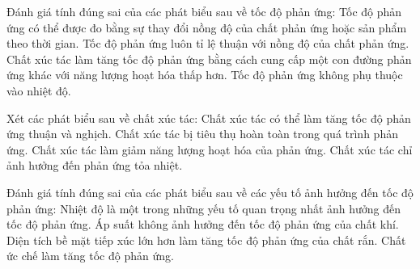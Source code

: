 \documentclass[Main.tex]{subfiles}
\begin{document}
\begin{ex}
	Đánh giá tính đúng sai của các phát biểu sau về tốc độ phản ứng:
	\choiceTF
	{\True Tốc độ phản ứng có thể được đo bằng sự thay đổi nồng độ của chất phản ứng hoặc sản phẩm theo thời gian.}
	{Tốc độ phản ứng luôn tỉ lệ thuận với nồng độ của chất phản ứng.}
	{\True Chất xúc tác làm tăng tốc độ phản ứng bằng cách cung cấp một con đường phản ứng khác với năng lượng hoạt hóa thấp hơn.}
	{Tốc độ phản ứng không phụ thuộc vào nhiệt độ.}
\end{ex}
\begin{ex}
	Xét các phát biểu sau về chất xúc tác:
	\choiceTF
	{\True Chất xúc tác có thể làm tăng tốc độ phản ứng thuận và nghịch.}
	{Chất xúc tác bị tiêu thụ hoàn toàn trong quá trình phản ứng.}
	{\True Chất xúc tác làm giảm năng lượng hoạt hóa của phản ứng.}
	{Chất xúc tác chỉ ảnh hưởng đến phản ứng tỏa nhiệt.}
\end{ex}
\begin{ex}
	Đánh giá tính đúng sai của các phát biểu sau về các yếu tố ảnh hưởng đến tốc độ phản ứng:
	\choiceTF
	{\True Nhiệt độ là một trong những yếu tố quan trọng nhất ảnh hưởng đến tốc độ phản ứng.}
	{Áp suất không ảnh hưởng đến tốc độ phản ứng của chất khí.}
	{\True Diện tích bề mặt tiếp xúc lớn hơn làm tăng tốc độ phản ứng của chất rắn.}
	{Chất ức chế làm tăng tốc độ phản ứng.}
\end{ex}
\end{document}
